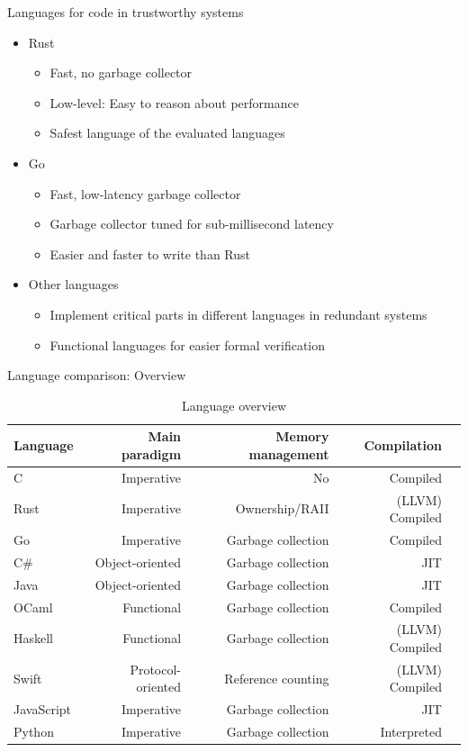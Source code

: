 \documentclass[NET,english,aspectratio=169,notitleframe]{tumbeamer}
\begin{document}
\begin{frame}{Languages for code in trustworthy systems}
\begin{itemize}
\item Rust
\begin{itemize}
\item Fast, no garbage collector
\item Low-level: Easy to reason about performance
\item Safest language of the evaluated languages
\end{itemize}
\item Go
\begin{itemize}
\item Fast, low-latency garbage collector
\item Garbage collector tuned for sub-millisecond latency
\item Easier and faster to write than Rust
\end{itemize}
\pause
\item Other languages
\begin{itemize}
\item Implement critical parts in different languages in redundant systems
\item Functional languages for easier formal verification
\end{itemize}
\end{itemize}
\end{frame}

\begin{frame}{Language comparison: Overview}
\begin{table}[t]
 \setlength{\tabcolsep}{2mm}
	\centering
	\footnotesize
	\begin{tabular}{lrrrr}
		\textbf{Language} & \textbf{Main paradigm} & \textbf{Memory management} & \textbf{Compilation} \\
		\toprule
		C & Imperative & No & Compiled \\
		Rust & Imperative & Ownership/RAII & (LLVM) Compiled \\
		Go & Imperative & Garbage collection & Compiled \\
		C\# & Object-oriented & Garbage collection & JIT \\
		Java & Object-oriented & Garbage collection & JIT \\
		OCaml & Functional & Garbage collection & Compiled \\
		Haskell & Functional & Garbage collection & (LLVM) Compiled \\
		Swift & Protocol-oriented & Reference counting & (LLVM) Compiled \\
		JavaScript & Imperative & Garbage collection & JIT \\
		Python & Imperative & Garbage collection & Interpreted \\
		\bottomrule
	\end{tabular}
	\caption{Language overview}
	\label{tbl:languages}
\end{table}
\end{frame}
\end{document}
